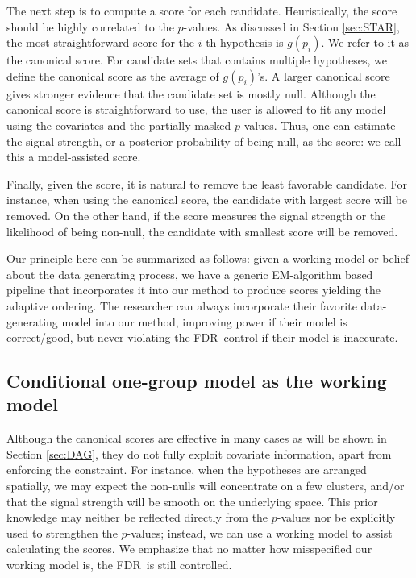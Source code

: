 \documentclass{biometrika}
\newcommand{\textFDR}{FDR}
\newcommand{\1}{\mathbf{1}}
\begin{document}
The next step is to compute a score for each candidate. Heuristically, the score should be highly correlated to the $p$-values. As discussed in Section \ref{sec:STAR}, the most straightforward score for the $i$-th hypothesis is $g(p_{i})$. We refer to it as the canonical score. For candidate sets that contains multiple hypotheses, we define the canonical score as the average of $g(p_i)$'s. A larger canonical score gives stronger evidence that the candidate set is mostly null. Although the canonical score is straightforward to use, the user is allowed to fit any model using the covariates and the partially-masked $p$-values. Thus, one can estimate the signal strength, or a posterior probability of being null, as the score: we call this a model-assisted score. 

Finally, given the score, it is natural to remove the least favorable candidate. For instance, when using the canonical score, the candidate with largest score will be removed. On the other hand, if the score measures the signal strength or the likelihood of being non-null, the candidate with smallest score will be removed.

Our principle here can be summarized as follows: given a working model or belief about the data generating process, we have a generic EM-algorithm based pipeline that incorporates it into our method to produce scores yielding the adaptive ordering. The researcher can always incorporate their favorite data-generating model into our method, improving power if their model is correct/good, but never violating the \textFDR ~control if their model is inaccurate.

\subsection{Conditional one-group model as the working model}\label{subsec:one-group}


Although the canonical scores are effective in many cases as will be shown in Section \ref{sec:DAG}, they do not fully exploit covariate information, apart from enforcing the constraint. For instance, when the hypotheses are arranged spatially, we may expect the non-nulls will concentrate on a few clusters, and/or that the signal strength will be smooth on the underlying space. This prior knowledge may neither be reflected directly from the $p$-values nor be explicitly used to strengthen the $p$-values; instead, we can use a working model to assist calculating the scores. We emphasize that no matter how misspecified our working model is, the \textFDR~is still controlled.
\end{document}
